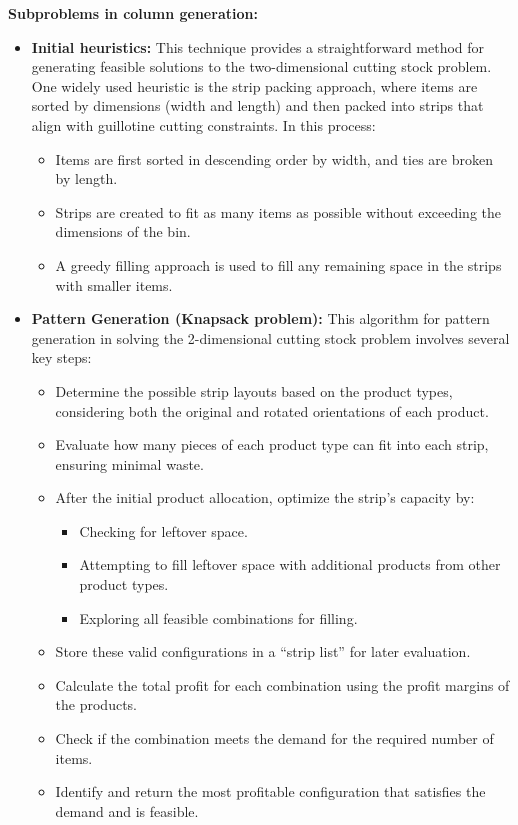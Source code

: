\documentclass[a4paper]{article}
\begin{document}
\noindent\textbf{Subproblems in column generation:} 
\begin{itemize}
    \item \textbf{Initial heuristics:} This technique provides a straightforward method for generating feasible solutions to the two-dimensional cutting stock problem. One widely used heuristic is the strip packing approach, where items are sorted by dimensions (width and length) and then packed into strips that align with guillotine cutting constraints. In this process:
\begin{itemize}     
    \item Items are first sorted in descending order by width, and ties are broken by length.     
    \item Strips are created to fit as many items as possible without exceeding the dimensions of the bin.      
    \item A greedy filling approach is used to fill any remaining space in the strips with smaller items. 
\end{itemize}
\item \textbf{Pattern Generation (Knapsack problem): }
This algorithm for pattern generation in solving the 2-dimensional cutting stock problem involves several key steps:
\begin{itemize}
    \item Determine the possible strip layouts based on the product types, considering both the original and rotated orientations of each product.
    \item Evaluate how many pieces of each product type can fit into each strip, ensuring minimal waste.
    \item After the initial product allocation, optimize the strip’s capacity by:
    \begin{itemize}
        \item Checking for leftover space.
        \item Attempting to fill leftover space with additional products from other product types.
        \item Exploring all feasible combinations for filling.
    \end{itemize}
    \item Store these valid configurations in a ``strip list'' for later evaluation.
    \item Calculate the total profit for each combination using the profit margins of the products.
    \item Check if the combination meets the demand for the required number of items.
    \item Identify and return the most profitable configuration that satisfies the demand and is feasible.
\end{itemize}
\end{itemize}
\end{document}
